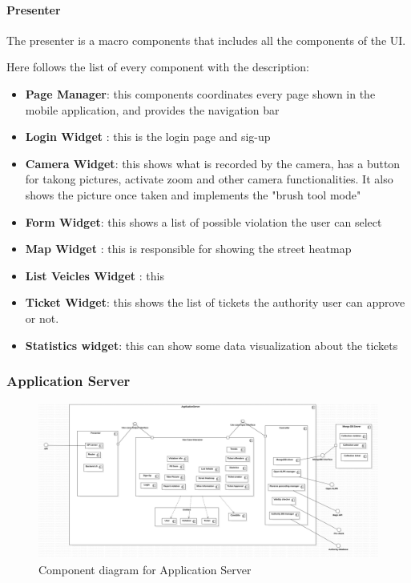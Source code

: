 \paragraph{Presenter}
The presenter is a macro components that includes all the components of the UI.

Here follows the list of every component with the description:
\begin{itemize}ù
  \item \textbf{Page Manager}: this components coordinates every page shown in the mobile application, and provides the navigation bar
  \item \textbf{Login Widget} : this is the login page and sig-up
  \item \textbf{Camera Widget}: this shows what is recorded by the camera, has a button for takong pictures, activate zoom and other camera functionalities. It also shows the picture once taken and implements the "brush tool mode"
  \item \textbf{Form Widget}: this shows a list of possible violation the user can select
  \item \textbf{Map Widget} : this is responsible for showing the street heatmap
  \item \textbf{List Veicles Widget} : this
  \item \textbf{Ticket Widget}: this shows the list of tickets the authority user can approve or not.
  \item \textbf{Statistics widget}: this can show some data visualization about the tickets
\end{itemize}





\subsubsection{Application Server} \label{API}
\begin{figure}
\centering
\includegraphics[width=\textwidth]{Images/ComponentDiagram2.png}
\caption{\label{fig:compdiag2} Component diagram for Application Server}
\end{figure}

